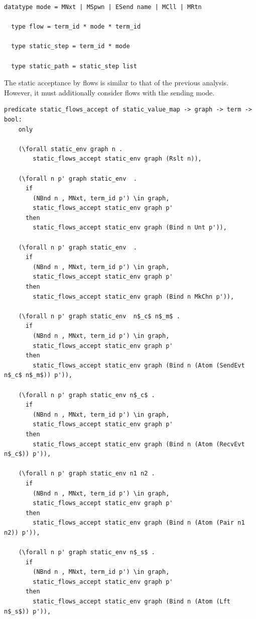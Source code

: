 \documentclass[10pt]{article}
\begin{document}
\begin{lstlisting}[language=logic, mathescape]
  datatype mode = MNxt | MSpwn | ESend name | MCll | MRtn

  type flow = term_id * mode * term_id

  type static_step = term_id * mode

  type static_path = static_step list
\end{lstlisting}

The static acceptance by flows is similar to that of the previous analysis.
However, it must additionally consider flows with the sending mode. 

\begin{lstlisting}[language=logic, mathescape]
  predicate static_flows_accept of static_value_map -> graph -> term -> bool:
    only
    
    (\forall static_env graph n .
        static_flows_accept static_env graph (Rslt n)),

    (\forall n p' graph static_env  .
      if
        (NBnd n , MNxt, term_id p') \in graph,
        static_flows_accept static_env graph p'
      then
        static_flows_accept static_env graph (Bind n Unt p')),

    (\forall n p' graph static_env  .
      if
        (NBnd n , MNxt, term_id p') \in graph,
        static_flows_accept static_env graph p'
      then
        static_flows_accept static_env graph (Bind n MkChn p')),

    (\forall n p' graph static_env  n$_c$ n$_m$ .
      if
        (NBnd n , MNxt, term_id p') \in graph,
        static_flows_accept static_env graph p'
      then
        static_flows_accept static_env graph (Bind n (Atom (SendEvt n$_c$ n$_m$)) p')),

    (\forall n p' graph static_env n$_c$ .
      if
        (NBnd n , MNxt, term_id p') \in graph,
        static_flows_accept static_env graph p'
      then
        static_flows_accept static_env graph (Bind n (Atom (RecvEvt n$_c$)) p')),

    (\forall n p' graph static_env n1 n2 .
      if
        (NBnd n , MNxt, term_id p') \in graph,
        static_flows_accept static_env graph p'
      then
        static_flows_accept static_env graph (Bind n (Atom (Pair n1 n2)) p')),

    (\forall n p' graph static_env n$_s$ .
      if
        (NBnd n , MNxt, term_id p') \in graph,
        static_flows_accept static_env graph p'
      then
        static_flows_accept static_env graph (Bind n (Atom (Lft n$_s$)) p')),


\end{lstlisting}
\end{document}
